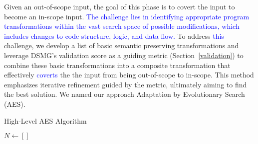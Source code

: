 Given an out-of-scope input, the goal of this phase is to covert the input to become an in-scope input. 
\textcolor{blue}{The challenge lies in identifying appropriate program transformations within the vast search space of possible modifications, which includes changes to code structure, logic, and data flow. }
To address \textcolor{blue}{this} challenge, we develop a list of basic semantic preserving transformations and leverage DSMG’s validation score as a guiding metric (Section~\ref{validation}) to combine these basic transformations into a composite transformation that effectively \textcolor{blue}{coverts} the the input from being out-of-scope to in-scope. This method emphasizes iterative refinement guided by the metric, ultimately aiming to find the best solution. We named our approach Adaptation by Evolutionary Search (AES). 

 {
\begin{algorithm}
\caption{High-Level AES Algorithm}
\label{alg:GA}
\small
\DontPrintSemicolon
{}


$N \leftarrow []$\;


\;
\end{algorithm}
}


